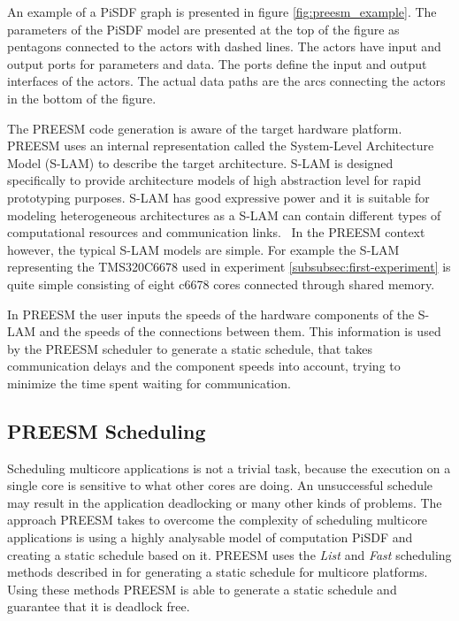 An example of a PiSDF graph is presented in figure \ref{fig:preesm_example}. The parameters of the PiSDF model are presented at the top of the figure as pentagons connected to the actors with dashed lines. The actors have input and output ports for parameters and data. The ports define the input and output interfaces of the actors. The actual data paths are the arcs connecting the actors in the bottom of the figure.

The PREESM code generation is aware of the target hardware platform. PREESM uses an internal representation called the System-Level Architecture Model (S-LAM) \cite{pelcat2009system} to describe the target architecture. S-LAM is designed specifically to provide architecture models of high abstraction level for rapid prototyping purposes. S-LAM has good expressive power and it is suitable for modeling heterogeneous architectures as a S-LAM can contain different types of computational resources and communication links.~\cite{pelcat2009system} In the PREESM context however, the typical S-LAM models are simple. For example the S-LAM representing the TMS320C6678 used in experiment \ref{subsubsec:first-experiment} is quite simple consisting of eight c6678 cores connected through shared memory.

In PREESM the user inputs the speeds of the hardware components of the S-LAM and the speeds of the connections between them. This information is used by the PREESM scheduler to generate a static schedule, that takes communication delays and the component speeds into account, trying to minimize the time spent waiting for communication.~\cite{pelcat2009system}

\subsection{PREESM Scheduling}
\label{sec:preesm-scheduling}
Scheduling multicore applications is not a trivial task, because the execution on a single core is sensitive to what other cores are doing. An unsuccessful schedule may result in the application deadlocking or many other kinds of problems. The approach PREESM takes to overcome the complexity of scheduling multicore applications is using a highly analysable model of computation PiSDF and creating a static schedule based on it. PREESM uses the \textit{List} and \textit{Fast} scheduling methods described in \cite{kwok1997high} for generating a static schedule for multicore platforms. Using these methods PREESM is able to generate a static schedule and guarantee that it is deadlock free.

